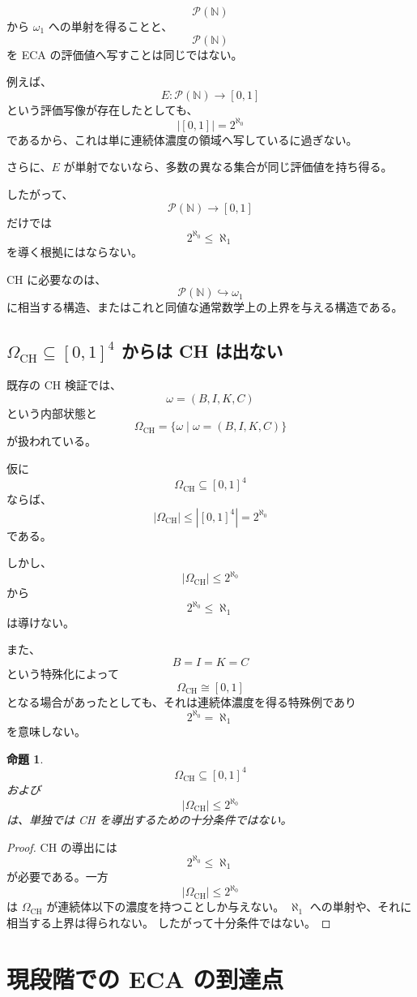 \documentclass[a4paper,11pt]{article}
\newtheorem{proposition}[definition]{命題}
\newcommand{\N}{\mathbb{N}}
\newcommand{\Pow}{\mathcal{P}}
\begin{document}
\[
\Pow(\N)
\]
から $\omega_1$ への単射を得ることと、
\[
\Pow(\N)
\]
を ECA の評価値へ写すことは同じではない。

例えば、
\[
E:\Pow(\N)\to[0,1]
\]
という評価写像が存在したとしても、
\[
|[0,1]|=2^{\aleph_0}
\]
であるから、これは単に連続体濃度の領域へ写しているに過ぎない。

さらに、$E$ が単射でないなら、多数の異なる集合が同じ評価値を持ち得る。

したがって、
\[
\boxed{
\Pow(\N)\to[0,1]
}
\]
だけでは
\[
2^{\aleph_0}\leq\aleph_1
\]
を導く根拠にはならない。

CH に必要なのは、
\[
\boxed{
\Pow(\N)\hookrightarrow\omega_1
}
\]
に相当する構造、またはこれと同値な通常数学上の上界を与える構造である。

\subsection{$\Omega_{\mathrm{CH}}\subseteq[0,1]^4$ からは CH は出ない}

既存の CH 検証では、
\[
\omega=(B,I,K,C)
\]
という内部状態と
\[
\Omega_{\mathrm{CH}}
=
\{\omega\mid\omega=(B,I,K,C)\}
\]
が扱われている。

仮に
\[
\Omega_{\mathrm{CH}}\subseteq[0,1]^4
\]
ならば、
\[
|\Omega_{\mathrm{CH}}|
\leq
|[0,1]^4|
=
2^{\aleph_0}
\]
である。

しかし、
\[
|\Omega_{\mathrm{CH}}|\leq2^{\aleph_0}
\]
から
\[
2^{\aleph_0}\leq\aleph_1
\]
は導けない。

また、
\[
B=I=K=C
\]
という特殊化によって
\[
\Omega_{\mathrm{CH}}\cong[0,1]
\]
となる場合があったとしても、それは連続体濃度を得る特殊例であり
\[
2^{\aleph_0}=\aleph_1
\]
を意味しない。

\begin{proposition}
\[
\Omega_{\mathrm{CH}}\subseteq[0,1]^4
\]
および
\[
|\Omega_{\mathrm{CH}}|\leq2^{\aleph_0}
\]
は、単独では CH を導出するための十分条件ではない。
\end{proposition}

\begin{proof}
CH の導出には
\[
2^{\aleph_0}\leq\aleph_1
\]
が必要である。一方
\[
|\Omega_{\mathrm{CH}}|\leq2^{\aleph_0}
\]
は $\Omega_{\mathrm{CH}}$ が連続体以下の濃度を持つことしか与えない。
$\aleph_1$ への単射や、それに相当する上界は得られない。
したがって十分条件ではない。
\end{proof}

\section{現段階での ECA の到達点}
\end{document}
